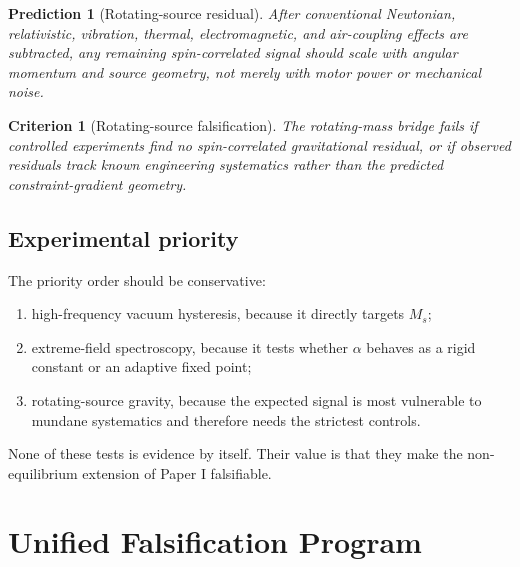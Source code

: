 \documentclass[11pt]{article}
\newtheorem{prediction}{Prediction}
\newtheorem{criterion}{Criterion}
\begin{document}
\begin{prediction}[Rotating-source residual]
After conventional Newtonian, relativistic, vibration, thermal, electromagnetic,
and air-coupling effects are subtracted, any remaining spin-correlated signal
should scale with angular momentum and source geometry, not merely with motor
power or mechanical noise.
\end{prediction}

\begin{criterion}[Rotating-source falsification]
The rotating-mass bridge fails if controlled experiments find no spin-correlated
gravitational residual, or if observed residuals track known engineering
systematics rather than the predicted constraint-gradient geometry.
\end{criterion}

\subsection{Experimental priority}

The priority order should be conservative:
\begin{enumerate}
    \item high-frequency vacuum hysteresis, because it directly targets $M_s$;
    \item extreme-field spectroscopy, because it tests whether $\alpha$ behaves
          as a rigid constant or an adaptive fixed point;
    \item rotating-source gravity, because the expected signal is most vulnerable
          to mundane systematics and therefore needs the strictest controls.
\end{enumerate}
None of these tests is evidence by itself. Their value is that they make the
non-equilibrium extension of Paper I falsifiable.

\section{Unified Falsification Program}
\end{document}
